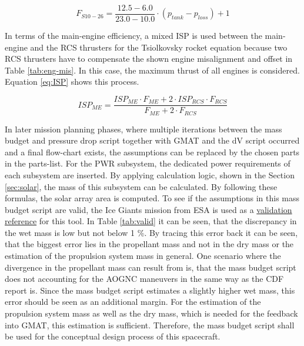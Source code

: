 \begin{equation}
F_{S10-26} =  \frac {12.5-6.0}{23.0-10.0} \cdot (p_{tank}-p_{loss}) + 1
\label{eq:S10}
\end{equation}

In terms of the main-engine efficiency, a mixed ISP is used between the main-engine and the RCS thrusters for the Tsiolkovsky rocket equation because two RCS thrusters have to compensate the shown engine misalignment and offset in Table \ref{tab:eng-mis}. In this case, the maximum thrust of all engines is considered. Equation \ref{eq:ISP} shows this process. 

\begin{equation}
ISP_{ME} = \frac {ISP_{ME} \cdot F_{ME} + 2 \cdot ISP_{RCS} \cdot F_{RCS}} {F_{ME} + 2 \cdot F_{RCS}}
\label{eq:ISP}
\end{equation}

In later mission planning phases, where multiple iterations between the mass budget and pressure drop script together with GMAT and the dV script occurred and a final flow-chart exists, the assumptions can be replaced by the chosen parts in the parts-list. For the PWR subsystem, the dedicated power requirements of each subsystem are inserted. By applying calculation logic, shown in the Section \ref{sec:solar}, the mass of this subsystem can be calculated. By following these formulas, the solar array area is computed. 
To see if the assumptions in this mass budget script are valid, the Ice Giants mission from ESA is used as a \href{https://github.com/Sven-J-Steinert/MomenTUM/blob/main/MATLAB/mass_design_icygigants.m}{\colorbox{codegray}{validation reference}} for this tool. In Table \ref{tab:valid} it can be seen, that the discrepancy in the wet mass is low but not below 1 \%. By tracing this error back it can be seen, that the biggest error lies in the propellant mass and not in the dry mass or the estimation of the propulsion system mass in general. One scenario where the divergence in the propellant mass can result from is, that the mass budget script does not accounting for the AOGNC maneuvers in the same way as the CDF report is. Since the mass budget script estimates a slightly higher wet mass, this error should be seen as an additional margin. For the estimation of the propulsion system mass as well as the dry mass, which is needed for the feedback into GMAT, this estimation is sufficient. Therefore, the mass budget script shall be used for the conceptual design process of this spacecraft.

